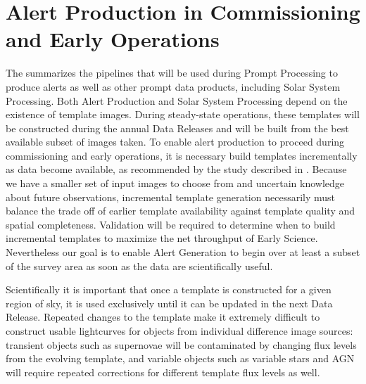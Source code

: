 
%


\section{Alert Production in Commissioning and Early Operations}
\label{sec:pp}




The \DPDD{} summarizes the pipelines that will be used during Prompt Processing to produce alerts as well as other prompt data products, including Solar System Processing.
Both Alert Production and Solar System Processing depend on the existence of template images.
During steady-state operations, these templates will be constructed during the annual Data Releases and will be built from the best available subset of images taken.
To enable alert production to proceed during commissioning and early operations, it is necessary build templates incrementally as data become available, as recommended by the study described in .
Because we have a smaller set of input images to choose from and uncertain knowledge about future observations, incremental template generation necessarily must balance the trade off of earlier template availability against template quality and spatial completeness.
Validation will be required to determine when to build incremental templates to maximize the net throughput of Early Science.
Nevertheless our goal is to enable Alert Generation to begin over at least a subset of the survey area as soon as the data are scientifically useful.

Scientifically it is important that once a template is constructed for a given region of sky, it is used exclusively until it can be updated in the next Data Release.
Repeated changes to the template make it extremely difficult to construct usable lightcurves for objects from individual difference image sources: transient objects such as supernovae will be contaminated by changing flux levels from the evolving template, and variable objects such as variable stars and AGN will require repeated corrections for different template flux levels as well.


